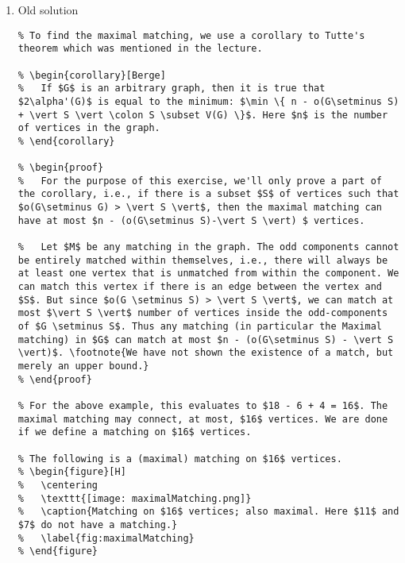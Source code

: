 \documentclass[11pt]{article}
\def\min{\operatorname{min}}
\begin{document}
\begin{enumerate}
\item Old solution
\label{sec:orgd9e43de}
\begin{verbatim}
% To find the maximal matching, we use a corollary to Tutte's theorem which was mentioned in the lecture.

% \begin{corollary}[Berge]
%   If $G$ is an arbitrary graph, then it is true that $2\alpha'(G)$ is equal to the minimum: $\min \{ n - o(G\setminus S) + \vert S \vert \colon S \subset V(G) \}$. Here $n$ is the number of vertices in the graph.
% \end{corollary}

% \begin{proof}
%   For the purpose of this exercise, we'll only prove a part of the corollary, i.e., if there is a subset $S$ of vertices such that $o(G\setminus G) > \vert S \vert$, then the maximal matching can have at most $n - (o(G\setminus S)-\vert S \vert) $ vertices. 

%   Let $M$ be any matching in the graph. The odd components cannot be entirely matched within themselves, i.e., there will always be at least one vertex that is unmatched from within the component. We can match this vertex if there is an edge between the vertex and $S$. But since $o(G \setminus S) > \vert S \vert$, we can match at most $\vert S \vert$ number of vertices inside the odd-components of $G \setminus S$. Thus any matching (in particular the Maximal matching) in $G$ can match at most $n - (o(G\setminus S) - \vert S \vert)$. \footnote{We have not shown the existence of a match, but merely an upper bound.}
% \end{proof}

% For the above example, this evaluates to $18 - 6 + 4 = 16$. The maximal matching may connect, at most, $16$ vertices. We are done if we define a matching on $16$ vertices.

% The following is a (maximal) matching on $16$ vertices.
% \begin{figure}[H]
%   \centering
%   \texttt{[image: maximalMatching.png]}
%   \caption{Matching on $16$ vertices; also maximal. Here $11$ and $7$ do not have a matching.}
%   \label{fig:maximalMatching}
% \end{figure}
\end{verbatim}
\end{enumerate}
\end{document}
